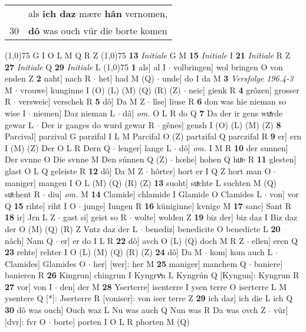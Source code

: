 \documentclass[8pt,a4paper,notitlepage]{article}
\begin{document}
\begin{table}[ht]
\begin{minipage}[t]{0.5\linewidth}
\begin{tabular}{rl}
 & als \textbf{ich daz} mære \textbf{hân} vernomen,\\ 
30 & \textbf{dô} was ouch vür die borte komen\\ 
\end{tabular}
\scriptsize
\line(1,0){75} \newline
G I O L M Q R Z \newline
\line(1,0){75} \newline
\textbf{13} \textit{Initiale} G M  \textbf{15} \textit{Initiale} I  \textbf{21} \textit{Initiale} R Z  \textbf{27} \textit{Initiale} Q  \textbf{29} \textit{Initiale} L  \newline
\line(1,0){75} \newline
\textbf{1} als] al I  $\cdot$ volbringen] wol bringen O von enden Z \textbf{2} naht] nach R  $\cdot$ het] had M (Q)  $\cdot$ unde] do I da M \textbf{3} \textit{Versfolge 196.4-3} M   $\cdot$ vrouwe] kunginne I (O) (L) (M) (Q) (R) (Z)  $\cdot$ neic] gienk R \textbf{4} grôzen] grosser R  $\cdot$ versweic] verschek R \textbf{5} dô] Da M Z  $\cdot$ lîse] liuse R \textbf{6} don was hie nieman so wise I  $\cdot$ niemen] Daz nieman L  $\cdot$ dâ] \textit{om.} O L R do Q \textbf{7} Da der ir gens wuͯrde gewar L  $\cdot$ Der ir ganges do wurd gewar R  $\cdot$ gênes] gensh I (O) (L) (M) (Z) \textbf{8} Parcival] parzival G parzifal I L M Parcifal O (Z) partzifal Q parczifal R \textbf{9} er] ern I (M) (Z) Der O L R Dern Q  $\cdot$ lenger] lange L  $\cdot$ dô] \textit{om.} I M R \textbf{10} der sunnen] Der svnne O Die svnne M Den súnnen Q (Z)  $\cdot$ hœhe] hohen Q huͦe R \textbf{11} glesten] glast O L Q geleiste R \textbf{12} dô] Da M Z  $\cdot$ hôrter] hort er I Q Z hort man O  $\cdot$ maniger] mangen I O L (M) (Q) (R) (Z) \textbf{13} suoht] suͯchte L suchten M (Q) suͦchent R  $\cdot$ diu] \textit{om.} M \textbf{14} Clamide] chlamide I Glamide O Clamides L  $\cdot$ von] vor Q \textbf{15} rihte] riht I O  $\cdot$ junge] Iungen R \textbf{16} küniginne] kvnige M \textbf{17} sanc] Sant R \textbf{18} ir] Jrn L Z  $\cdot$ gast si] geist so R  $\cdot$ wolte] wolden Z \textbf{19} biz der] biz daz I Biz daz der O (M) (Q) (R) Z Vntz daz der L  $\cdot$ benediz] benedicite O benedicte L \textbf{20} nâch] Nam Q  $\cdot$ er] er do I L R \textbf{22} dô] avch O (L) (Q) doch M R Z  $\cdot$ ellen] eren Q \textbf{23} rehte] rehter I O (L) (M) (Q) (R) (Z) \textbf{24} dô] Da M  $\cdot$ kom] kom auch L  $\cdot$ Clamides] Glamides O  $\cdot$ her] [wer]: her M \textbf{25} maniger] manchem Q  $\cdot$ baniere] banieren R \textbf{26} Kingrun] chingrun I Kyngrvͯn L Kyngrún Q [Kyngun]: Kyngrun R \textbf{27} vor] von I  $\cdot$ den] der M \textbf{28} Yserterre] isenterre I ysen terre O iserterre L M ysentere Q [*]: Jserterre R [voniser]: von iser terre Z \textbf{29} ich daz] ich die L ich Q \textbf{30} dô was ouch] Ouch waz L Nu was auch Q Nun was R Da was ovch Z  $\cdot$ vür] [dvr]: fvr O  $\cdot$ borte] porten I O L R phorten M (Q) \newline

\end{minipage}
\end{table}
\end{document}
